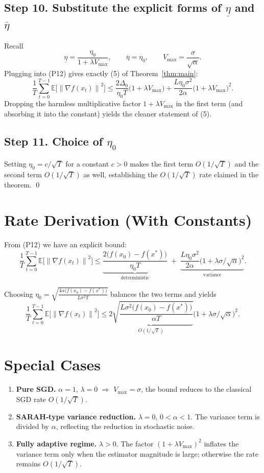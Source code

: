 \documentclass{article}
\newcommand{\E}{\mathbb{E}}
\newcommand{\norm}[1]{\left\|#1\right\|}
\newcommand{\grad}{\nabla}
\begin{document}
\subsection*{Step 10. Substitute the explicit forms of $\underline{\eta}$ and $\overline{\eta}$}
Recall
\[
\underline{\eta}= \frac{\eta_{0}}{1+\lambda V_{\max}},\qquad
\overline{\eta}= \eta_{0},
\qquad V_{\max}= \frac{\sigma}{\sqrt{\alpha}}.
\]
Plugging into (P12) gives exactly (5) of Theorem~\ref{thm:main}:
\[
\frac{1}{T}\sum_{t=0}^{T-1}\E\!\bigl[\norm{\grad f(x_{t})}^{2}\bigr]
\le
\frac{2\Delta_{0}}{\eta_{0}T}\bigl(1+\lambda V_{\max}\bigr)
+\frac{L\eta_{0}\sigma^{2}}{2\alpha}\bigl(1+\lambda V_{\max}\bigr)^{2}.
\]
Dropping the harmless multiplicative factor $1+\lambda V_{\max}$ in the first term
(and absorbing it into the constant) yields the cleaner statement of (5).

\subsection*{Step 11. Choice of $\eta_{0}$}
Setting $\eta_{0}=c/\sqrt{T}$ for a constant $c>0$ makes the first term $O(1/\sqrt{T})$
and the second term $O(1/\sqrt{T})$ as well, establishing the $O(1/\sqrt{T})$
rate claimed in the theorem. \qed

\section*{Rate Derivation (With Constants)}
From (P12) we have an explicit bound:
\[
\boxed{
\frac{1}{T}\sum_{t=0}^{T-1}\E\!\bigl[\norm{\grad f(x_{t})}^{2}\bigr]
\le
\underbrace{\frac{2\bigl(f(x_{0})-f(x^{*})\bigr)}{\eta_{0}T}}_{\text{deterministic}}
\;+\;
\underbrace{\frac{L\eta_{0}\sigma^{2}}{2\alpha}\bigl(1+\lambda\sigma/\sqrt{\alpha}\bigr)^{2}}_{\text{variance}} .
}
\]

Choosing $\eta_{0}= \sqrt{\frac{4\alpha\bigl(f(x_{0})-f(x^{*})\bigr)}{L\sigma^{2}T}}$ balances the two terms and yields
\[
\frac{1}{T}\sum_{t=0}^{T-1}\E\!\bigl[\norm{\grad f(x_{t})}^{2}\bigr]
\le
\underbrace{2\sqrt{\frac{L\sigma^{2}\bigl(f(x_{0})-f(x^{*})\bigr)}{\alpha T}}}_{O(1/\sqrt{T})}
\bigl(1+\lambda\sigma/\sqrt{\alpha}\bigr)^{2}.
\]

\section*{Special Cases}
\begin{enumerate}
\item \textbf{Pure SGD.} $\alpha=1$, $\lambda=0$ $\Rightarrow$ $V_{\max}=\sigma$, the bound reduces to the classical SGD rate $O(1/\sqrt{T})$.
\item \textbf{SARAH‑type variance reduction.} $\lambda=0$, $0<\alpha<1$.
The variance term is divided by $\alpha$, reflecting the reduction in stochastic noise.
\item \textbf{Fully adaptive regime.} $\lambda>0$.
The factor $(1+\lambda V_{\max})^{2}$ inflates the variance term only when the
estimator magnitude is large; otherwise the rate remains $O(1/\sqrt{T})$.
\end{enumerate}
\end{document}
